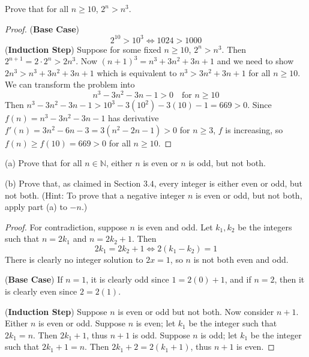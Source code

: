 \begin{tcolorbox}[title=Problem 15, breakable]
    Prove that for all $n \ge 10$, $2^n > n^3$.
\end{tcolorbox}

\begin{proof}
    (\textbf{Base Case})
    \[2^{10} > 10^3 \iff 1024 > 1000\]
    (\textbf{Induction Step}) Suppose for some fixed $n \ge 10$, $2^n > n^3$.
    Then $2^{n + 1} = 2 \cdot 2^n > 2n^3$.
    Now $(n + 1)^3 = n^3 + 3n^2 + 3n + 1$ and we need to show 
        $2n^3 > n^3 + 3n^2 + 3n + 1$ which is equivalent to 
        $n^3 > 3n^2 + 3n + 1$ for all $n \ge 10$.
    We can transform the problem into
    \[n^3 - 3n^2 - 3n - 1 > 0 \quad \text{for } n \ge 10\]
    Then $n^3 - 3n^2 - 3n - 1 > 10^3 - 3(10^2) - 3(10) - 1 = 669 > 0$.
    Since \(f(n) = n^3 - 3n^2 - 3n - 1\) has derivative 
    \(f'(n) = 3n^2 - 6n - 3 = 3(n^2 - 2n - 1) > 0\) for \(n \ge 3\), \(f\) is increasing, 
    so \(f(n) \ge f(10) = 669 > 0\) for all \(n \ge 10\).
\end{proof}

\begin{tcolorbox}[title=Problem 16, breakable]
    (a) Prove that for all $n \in \mathbb{N}$, either $n$ 
        is even or $n$ is odd, but not both.

    (b) Prove that, as claimed in Section $3.4$, every integer 
        is either even or odd, but not both. (Hint: 
        To prove that a negative integer $n$ is even or odd,
        but not both, apply part (a) to $-n$.)
\end{tcolorbox}

\begin{proof}
    For contradiction, suppose $n$ is even and odd.
    Let $k_1, k_2$ be the integers such that $n = 2k_1$ and $n = 2 k_2 + 1$.
    Then 
    \[
        2k_1 = 2k_2 + 1 \iff 2(k_1 - k_2) = 1
    \]
    There is clearly no integer solution to $2x = 1$, so $n$ is not both even and odd.

    (\textbf{Base Case}) If $n = 1$, it is clearly odd since $1 = 2(0) + 1$,
        and if $n = 2$, then it is clearly even since $2 = 2(1)$.
    
    (\textbf{Induction Step}) Suppose $n$ is even or odd but not both.
    Now consider $n + 1$. Either $n$ is even or odd. 
    Suppose $n$ is even; let $k_1$ be the integer such that $2k_1 = n$.
    Then $2k_1 + 1$, thus $n + 1$ is odd.
    Suppose $n$ is odd; let $k_1$ be the integer such that $2k_1 + 1 = n$.
    Then $2k_1 + 2 = 2(k_1 + 1)$, thus $n + 1$ is even.
\end{proof}

